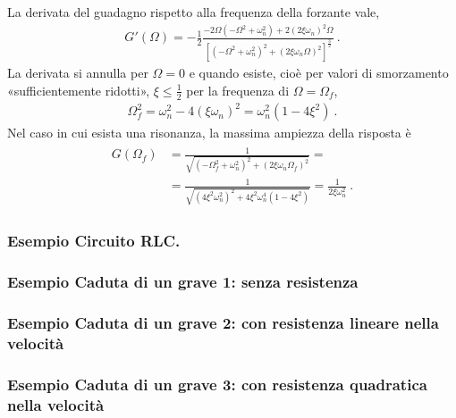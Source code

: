 \documentclass[letterpaper,10pt,italian]{jupyterBook}
\begin{document}
\sphinxAtStartPar
{} La derivata del guadagno rispetto alla frequenza della forzante vale,
\begin{equation*}
\begin{split}G'(\Omega) = -\frac{1}{2} \frac{-2\Omega(-\Omega^2 + \omega_n^2) + 2(2\xi\omega_n)^2 \Omega}{\left[ (-\Omega^2+\omega_n^2)^2 + (2 \xi \omega_n \Omega)^2 \right]^{\frac{3}{2}} } \ .\end{split}
\end{equation*}
\sphinxAtStartPar
La derivata si annulla per \(\Omega = 0\) e \sphinxhyphen{} quando esiste, cioè per valori di smorzamento «sufficientemente ridotti», \(\xi \le \frac{1}{2}\) \sphinxhyphen{} per la frequenza di  \(\Omega = \Omega_f\),
\begin{equation*}
\begin{split}\Omega_f^2 = \omega_n^2 - 4 (\xi \omega_n)^2 = \omega_n^2 \left( 1 - 4 \xi^2 \right) \ .\end{split}
\end{equation*}
\sphinxAtStartPar
Nel caso in cui esista una risonanza, la massima ampiezza della risposta è
\begin{equation*}
\begin{split}\begin{aligned}
G(\Omega_f) 
  & = \frac{1}{\sqrt{(-\Omega_f^2+\omega_n^2)^2 + (2\xi \omega_n \Omega_f)^2}} = \\
  & = \frac{1}{\sqrt{(4 \xi^2 \omega_n^2)^2 + 4 \xi^2 \omega_n^4 (1-4 \xi^2)  }} = \frac{1}{2 \xi \omega_n^2} \ .
\end{aligned}\end{split}
\end{equation*}\subsubsection*{Esempio \sphinxhyphen{} Circuito RLC. }
\subsubsection*{Esempio \sphinxhyphen{} Caduta di un grave \sphinxhyphen{} 1: senza resistenza}
\subsubsection*{Esempio \sphinxhyphen{} Caduta di un grave \sphinxhyphen{} 2: con resistenza lineare nella velocità}
\subsubsection*{Esempio \sphinxhyphen{} Caduta di un grave \sphinxhyphen{} 3: con resistenza quadratica nella velocità}
\end{document}
